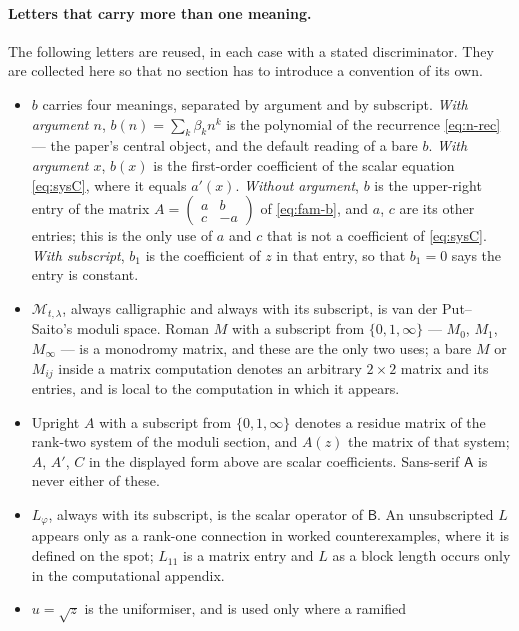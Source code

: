 \paragraph{Letters that carry more than one meaning.}
The following letters are reused, in each case with a stated discriminator.
They
are collected here so that no section has to introduce a convention of its own.
\begin{itemize}
  \item $b$ carries four meanings, separated by argument and by subscript.
    \emph{With argument $n$}, $b(n)=\sum_k\beta_k n^k$ is the polynomial of the
    recurrence \eqref{eq:n-rec} --- the paper's central object, and the default
    reading of a bare $b$. \emph{With argument $x$}, $b(x)$ is the first-order
    coefficient of the scalar equation \eqref{eq:sysC}, where it equals
    $a'(x)$. \emph{Without argument}, $b$ is the upper-right entry of the
    matrix $A=\left(\begin{smallmatrix} a & b\\ c & -a\end{smallmatrix}\right)$
    of \eqref{eq:fam-b}, and $a$, $c$ are its other entries; this is the only
    use of $a$ and $c$ that is not a coefficient of \eqref{eq:sysC}.
    \emph{With subscript}, $b_1$ is the coefficient of $z$ in that entry, so
    that $b_1=0$ says the entry is constant.
  \item $\mathcal M_{t,\lambda}$, always calligraphic and always with its
    subscript, is van der Put--Saito's moduli space. Roman $M$ with a
    subscript from $\{0,1,\infty\}$ --- $M_0$, $M_1$, $M_\infty$ --- is a
    monodromy matrix, and these are the only two uses; a bare $M$ or $M_{ij}$
    inside a matrix computation denotes an arbitrary $2\times2$ matrix and its
    entries, and is local to the computation in which it appears.
  \item Upright $A$ with a subscript from $\{0,1,\infty\}$ denotes a residue
    matrix of the rank-two system of the moduli section, and $A(z)$ the matrix
    of that system; $A$, $A'$, $C$ in the displayed form above are scalar
    coefficients. Sans-serif $\mathsf A$ is never either of these.
  \item $L_\varphi$, always with its subscript, is the scalar operator of
    $\mathsf B$. An unsubscripted $L$ appears only as a rank-one connection in
    worked counterexamples, where it is defined on the spot; $L_{11}$ is a
    matrix entry and $L$ as a block length occurs only in the computational
    appendix.
  \item $u=\sqrt z$ is the uniformiser, and is used only where a ramified

\end{itemize}
